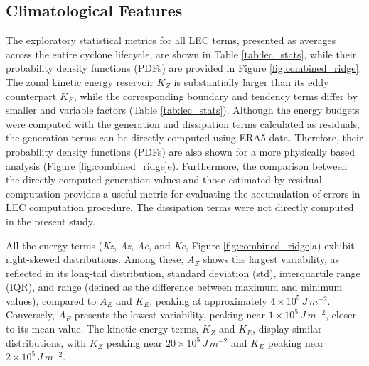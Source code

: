 \documentclass[pdflatex,sn-chicago]{sn-jnl}%
\theoremstyle{plain}
\theoremstyle{definition}
\theoremstyle{remark}
\theoremstyle{definition}
\begin{document}
\subsection{Climatological Features}\label{sec:climatology}

The exploratory statistical metrics for all LEC terms, presented as averages across the entire cyclone lifecycle, are shown in Table \ref{tab:lec_stats}, while their probability density functions (PDFs) are provided in Figure \ref{fig:combined_ridge}. The zonal kinetic energy reservoir $K_Z$ is substantially larger than its eddy counterpart $K_E$, while the corresponding boundary and tendency terms differ by smaller and variable factors (Table \ref{tab:lec_stats}). Although the energy budgets were computed with the generation and dissipation terms calculated as residuals, the generation terms can be directly computed using ERA5 data. Therefore, their probability density functions (PDFs) are also shown for a more physically based analysis (Figure \ref{fig:combined_ridge}e). Furthermore, the comparison between the directly computed generation values and those estimated by residual computation provides a useful metric for evaluating the accumulation of errors in LEC computation procedure. The dissipation terms were not directly computed in the present study.


All the energy terms (\textit{Kz}, \textit{Az}, \textit{Ae}, and \textit{Ke}, Figure \ref{fig:combined_ridge}a) exhibit right-skewed distributions. Among these, $A_Z$ shows the largest variability, as reflected in its long-tail distribution, standard deviation (std), interquartile range (IQR), and range (defined as the difference between maximum and minimum values), compared to $A_E$ and $K_E$, peaking at approximately $4 \times 10^5 \, J \, m^{-2}$. Conversely, $A_E$ presents the lowest variability, peaking near $1 \times 10^5 \, J \, m^{-2}$, closer to its mean value. The kinetic energy terms, $K_Z$ and $K_E$, display similar distributions, with $K_Z$ peaking near $20 \times 10^5 \, J \, m^{-2}$ and $K_E$ peaking near $2 \times 10^5 \, J \, m^{-2}$.
\end{document}
